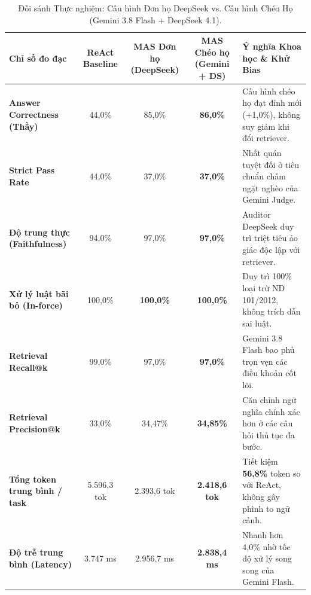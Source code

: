 \documentclass[10pt,a4paper]{article}
\begin{document}
\begin{table}[htbp]
\centering\footnotesize
\caption{Đối sánh Thực nghiệm: Cấu hình Đơn họ DeepSeek vs. Cấu hình Chéo Họ (Gemini 3.8 Flash + DeepSeek 4.1).}
\label{tab:cross-family-results}
\begin{tabularx}{\linewidth}{@{}p{3.8cm} c c c X@{}}
\toprule
\textbf{Chỉ số đo đạc} & \textbf{ReAct Baseline} & \textbf{MAS Đơn họ (DeepSeek)} & \textbf{MAS Chéo họ (Gemini + DS)} & \textbf{Ý nghĩa Khoa học \& Khử Bias} \\
\midrule
\textbf{Answer Correctness (Thầy)} & 44,0\% & 85,0\% & \textbf{86,0\%} & Cấu hình chéo họ đạt đỉnh mới (+1,0\%), không suy giảm khi đổi retriever. \\
\textbf{Strict Pass Rate} & 44,0\% & 37,0\% & \textbf{37,0\%} & Nhất quán tuyệt đối ở tiêu chuẩn chấm ngặt nghèo của Gemini Judge. \\
\textbf{Độ trung thực (Faithfulness)} & 94,0\% & 97,0\% & \textbf{97,0\%} & Auditor DeepSeek duy trì triệt tiêu ảo giác độc lập với retriever. \\
\textbf{Xử lý luật bãi bỏ (In-force)} & 100,0\% & \textbf{100,0\%} & \textbf{100,0\%} & Duy trì 100\% loại trừ NĐ 101/2012, không trích dẫn sai luật. \\
\textbf{Retrieval Recall@k} & 99,0\% & 97,0\% & \textbf{97,0\%} & Gemini 3.8 Flash bao phủ trọn vẹn các điều khoản cốt lõi. \\
\textbf{Retrieval Precision@k} & 33,0\% & 34,47\% & \textbf{34,85\%} & Căn chỉnh ngữ nghĩa chính xác hơn ở các câu hỏi thủ tục đa bước. \\
\textbf{Tổng token trung bình / task}& 5.596,3 tok & 2.393,6 tok & \textbf{2.418,6 tok} & Tiết kiệm \textbf{56,8\%} token so với ReAct, không gây phình to ngữ cảnh. \\
\textbf{Độ trễ trung bình (Latency)} & 3.747 ms & 2.956,7 ms & \textbf{2.838,4 ms} & Nhanh hơn 4,0\% nhờ tốc độ xử lý song song của Gemini Flash. \\
\bottomrule
\end{tabularx}
\end{table}
\end{document}
